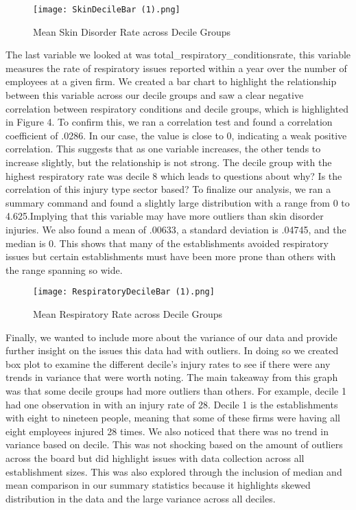 \documentclass[12pt]{article}
\begin{document}
\begin{figure}
    \centering
    \texttt{[image: SkinDecileBar (1).png]}
    \caption{Mean Skin Disorder Rate across Decile Groups}
    \label{Figure 3:}
\end{figure}

The last variable we looked at was total\_respiratory\_conditionsrate, this variable measures the rate of respiratory issues reported within a year over the number of employees at a given firm. We created a bar chart to highlight the relationship between this variable across our decile groups and saw a clear negative correlation between respiratory conditions and decile groups, which is highlighted in Figure 4. To confirm this, we ran a correlation test and found a correlation coefficient of .0286. In our case, the value is close to 0, indicating a weak positive correlation. This suggests that as one variable increases, the other tends to increase slightly, but the relationship is not strong. The decile group with the highest respiratory rate was decile 8 which leads to questions about why? Is the correlation of this injury type sector based? To finalize our analysis, we ran a summary command and found a slightly large distribution with a range from 0 to 4.625.Implying that this variable may have more outliers than skin disorder injuries. We also found a mean of .00633, a standard deviation is .04745, and the median is 0. This shows that many of the establishments avoided respiratory issues but certain establishments must have been more prone than others with the range spanning so wide. 


\begin{figure}
    \centering
    \texttt{[image: RespiratoryDecileBar (1).png]}
    \caption{Mean Respiratory Rate across Decile Groups}
    \label{Figure 4:}
\end{figure}

Finally, we wanted to include more about the variance of our data and provide further insight on the issues this data had with outliers. In doing so we created box plot to examine the different decile's injury rates to see if there were any trends in variance that were worth noting. The main takeaway from  this graph was that some decile groups had more outliers than others. For example, decile 1 had one observation in with an injury rate of 28. Decile 1 is the establishments with eight to nineteen people, meaning that some of these firms were having all eight employees injured 28 times. We also noticed that there was no trend in variance based on decile. This was not shocking based on the amount of outliers across the board but did highlight issues with data collection across all establishment sizes. This was also explored through the inclusion of median and mean comparison in our summary statistics because it highlights skewed distribution in the data and the large variance across all deciles. 
\end{document}
